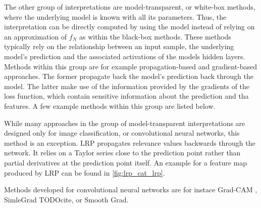 The other group of interpretations are model-transparent, or white-box methods, where the underlying model is known with all its parameters. Thus, the interpretation can be directly computed by using the model instead of relying on an approximation of $f_N$ as within the black-box methods. These methods typically rely on the relationship between an input sample, the underlying model's prediction and the associated activations of the models hidden layers. Methods within this group are for example propagation-based and gradient-based approaches. The former propagate back the model's prediction back through the model. The latter make use of the information provided by the gradients of the loss function, which contain sensitive information about the prediction and tha features. 
A few example methods within this group are listed below. 

 While many approaches in the group of model-transparent interpretations are designed only for image classification, or convolutional neural networks, this method \cite{bach2015pixel} is an exception. LRP propagates relevance values backwards through the network. It relies on a Taylor series close to the prediction point rather than partial derivatives at the prediction point itself. An example for a feature map produced by LRP can be found in \autoref{fig:lrp_cat_lrp}.

Methods developed for convolutional neural networks are for instace Grad-CAM \cite{selvaraju2017grad}, SimleGrad TODOcite, or Smooth Grad. 



